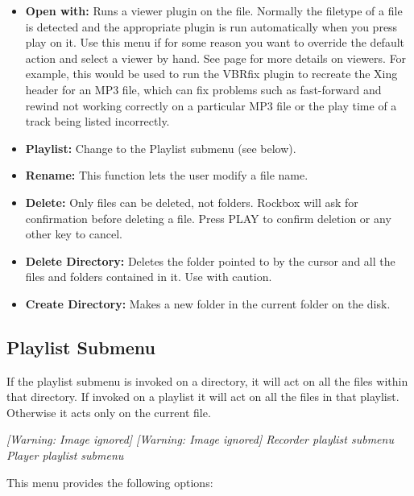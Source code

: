 \begin{itemize}
\item \textbf{Open with:} Runs a viewer plugin on the file. 
Normally the filetype of a file is detected and the appropriate plugin
is run automatically when you press play on it.  Use this menu if for
some reason you want to override the default action and select a viewer
by hand.  See page \textmd{\pageref{ref:Viewersplugins}} for more details on viewers.
For example, this would be used to run the VBRfix plugin to recreate the
Xing header for an MP3 file, which can fix problems such as
fast{}-forward and rewind not working correctly on a particular MP3 file or the play time of a track being listed incorrectly. 
\item \textbf{Playlist:} Change to the Playlist submenu (see below).
\item \textbf{Rename:} This function lets the user modify a file name.
\item \textbf{Delete:} Only files can be deleted, not folders. Rockbox will ask for confirmation before deleting a file. Press PLAY to confirm deletion or any other key to cancel.
\item \textbf{Delete Directory: }Deletes the folder pointed to by the cursor and all the files and folders contained in it.  Use with caution.
\item \textbf{Create Directory:} Makes a new folder in the current folder on
the disk.
\end{itemize}


\subsection{\label{ref:Playlistsubmenu}Playlist Submenu}
If the playlist submenu is invoked on a directory, it will act on all the files within that directory.  If invoked on a playlist it will act on all the files in that playlist. Otherwise it acts only on the current file.

{\centering\itshape
  [Warning: Image ignored] %
     [Warning: Image ignored] %
 \newline
  Recorder playlist submenu  Player playlist submenu
\par}

This menu provides the following options:

